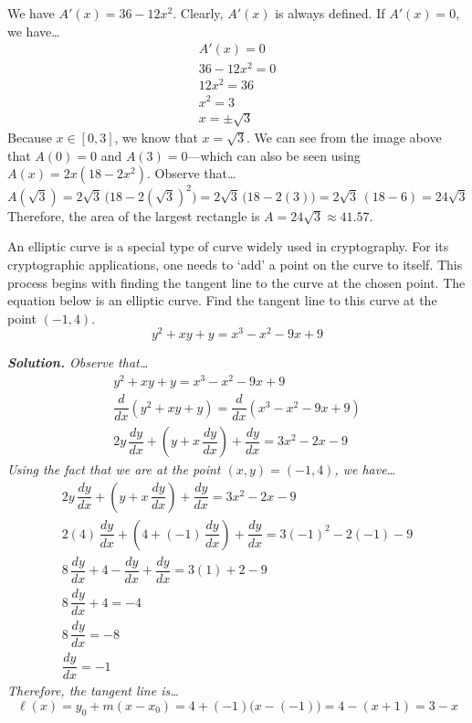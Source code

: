 \documentclass[12pt,letterpaper]{exam}
\begin{document}
\begin{questions}
{We have $A'(x)= 36 - 12x^2$. Clearly, $A'(x)$ is always defined. If $A'(x)= 0$, we have\dots
	\[
	\begin{gathered}
	A'(x)= 0 \\
	36 - 12x^2= 0 \\
	12x^2= 36 \\
	x^2= 3 \\
	x= \pm \sqrt{3}
	\end{gathered}
	\]
Because $x \in [0, 3]$, we know that $x= \sqrt{3}$. We can see from the image above that $A(0)= 0$ and $A(3)= 0$---which can also be seen using $A(x)= 2x(18 - 2x^2)$. Observe that\dots
	\[
	A(\sqrt{3})= 2 \sqrt{3} \, \big(18 - 2 (\sqrt{3})^2 \big)= 2 \sqrt{3} \,\big(18 - 2(3) \big)= 2 \sqrt{3} \,(18 - 6)= 24 \sqrt{3}
	\]
Therefore, the area of the largest rectangle is $A= 24 \sqrt{3} \approx 41.57$.
}



\newpage
\question[16] An elliptic curve is a special type of curve widely used in cryptography. For its cryptographic applications, one needs to `add' a point on the curve to itself. This process begins with finding the tangent line to the curve at the chosen point. The equation below is an elliptic curve. Find the tangent line to this curve at the point $(-1, 4)$.
	\[
	y^2 + xy + y= x^3 - x^2 - 9x + 9
	\] \pspace

{\itshape\textbf{Solution.} Observe that\dots
	\[
	\begin{gathered}
	y^2 + xy + y= x^3 - x^2 - 9x + 9 \\[0.1cm]
	\dfrac{d}{dx} \left(y^2 + xy + y \right)= \dfrac{d}{dx} \left( x^3 - x^2 - 9x + 9 \right) \\[0.1cm]
	2y \, \dfrac{dy}{dx} + \left(y + x \, \dfrac{dy}{dx} \right) + \dfrac{dy}{dx}= 3x^2 - 2x - 9
	\end{gathered}
	\]
Using the fact that we are at the point $(x, y)= (-1, 4)$, we have\dots
	\[
	\begin{gathered}
	2y \, \dfrac{dy}{dx} + \left(y + x \, \dfrac{dy}{dx} \right) + \dfrac{dy}{dx}= 3x^2 - 2x - 9 \\[0.1cm]
	2(4) \, \dfrac{dy}{dx} + \left(4 + (-1) \, \dfrac{dy}{dx} \right) + \dfrac{dy}{dx}= 3(-1)^2 - 2(-1) - 9 \\[0.1cm]
	8 \,\dfrac{dy}{dx} + 4 - \dfrac{dy}{dx} + \dfrac{dy}{dx}= 3(1) + 2 - 9 \\[0.1cm]
	8 \,\dfrac{dy}{dx} + 4= -4 \\[0.1cm]
	8\, \dfrac{dy}{dx}= -8 \\[0.1cm]
	\dfrac{dy}{dx}= -1
	\end{gathered}
	\]
Therefore, the tangent line is\dots
	\[
	\ell(x)= y_0 + m (x - x_0)= 4 + (-1) \big(x - (-1) \big)= 4 - (x + 1)= 3 - x
	\]
}




\end{questions}
\end{document}

